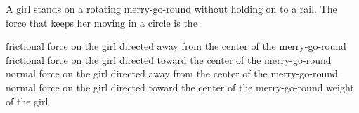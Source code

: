 \documentclass{../../../oss-apphys-exam}
\begin{document}

\raggedcolumns


\begin{questions}
  \question A girl stands on a rotating merry-go-round without holding on to a
  rail. The force that keeps her moving in a circle is the
  \begin{choices}
    \choice frictional force on the girl directed away from the center of the
    merry-go-round
    \choice frictional force on the girl directed toward the center of the
    merry-go-round
    \choice normal force on the girl directed away from the center of the
    merry-go-round
    \choice normal force on the girl directed toward the center of the
    merry-go-round
    \choice weight of the girl
  \end{choices}
    


\end{questions}
\end{document}
